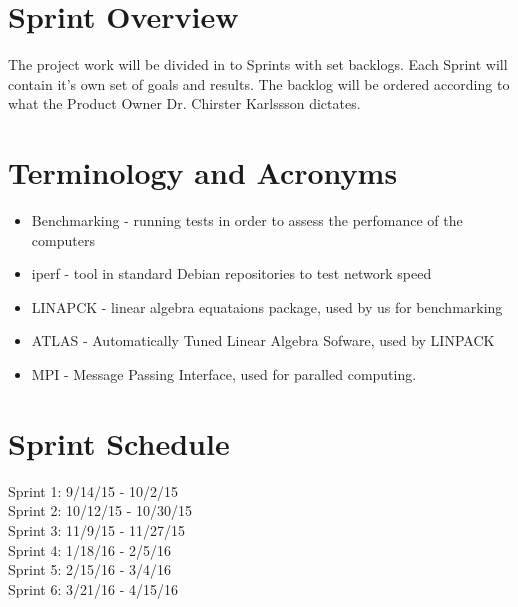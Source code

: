 \section{Sprint  Overview}


The project work will be divided in to Sprints with set backlogs. Each Sprint will contain it's own set of goals and results. The backlog will be ordered according to what the Product Owner Dr. Chirster Karlssson dictates. 

\section{Terminology and Acronyms}
\begin{itemize}
	\item Benchmarking - running tests in order to assess the perfomance of the computers
	\item iperf - tool in standard Debian repositories to test network speed
	\item LINAPCK - linear algebra equataions package, used by us for benchmarking
	\item ATLAS - Automatically Tuned Linear Algebra Sofware, used by LINPACK
	\item MPI - Message Passing Interface, used for paralled computing.	
\end{itemize}

\section{Sprint Schedule}

Sprint 1: 9/14/15 - 10/2/15 \\
Sprint 2: 10/12/15 - 10/30/15 \\
Sprint 3: 11/9/15 - 11/27/15 \\
Sprint 4: 1/18/16 - 2/5/16 \\
Sprint 5: 2/15/16 - 3/4/16 \\
Sprint 6: 3/21/16 - 4/15/16 \\


